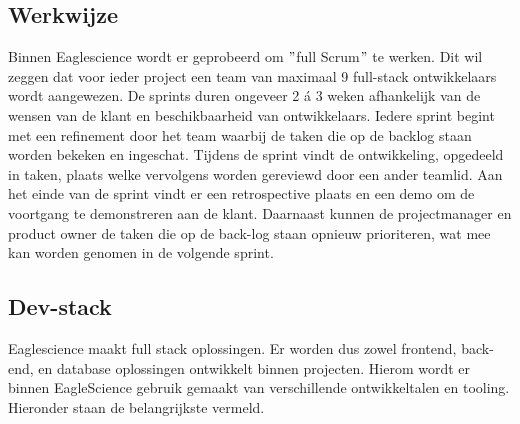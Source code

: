 \subsection{Werkwijze}\label{subsec:ESwerkwijze}
Binnen Eaglescience wordt er geprobeerd om $"$full Scrum$"$ te werken. Dit wil zeggen dat voor ieder project een team van maximaal 9 full-stack ontwikkelaars wordt aangewezen. De sprints duren ongeveer 2 á 3 weken afhankelijk van de wensen van de klant en beschikbaarheid van ontwikkelaars. Iedere sprint begint met een refinement door het team waarbij de taken die op de backlog staan worden bekeken en ingeschat. Tijdens de sprint vindt de ontwikkeling, opgedeeld in taken, plaats welke vervolgens worden gereviewd door een ander teamlid. Aan het einde van de sprint vindt er een retrospective plaats en een demo om de voortgang te demonstreren aan de klant. Daarnaast kunnen de projectmanager en product owner de taken die op de back-log staan opnieuw prioriteren, wat mee kan worden genomen in de volgende sprint.

\subsection{Dev-stack}\label{subsec:ESdev-stack}
Eaglescience maakt full stack oplossingen. Er worden dus zowel frontend, back-end, en database oplossingen ontwikkelt binnen projecten. Hierom wordt er binnen EagleScience gebruik gemaakt van verschillende ontwikkeltalen en tooling. Hieronder staan de belangrijkste vermeld.

